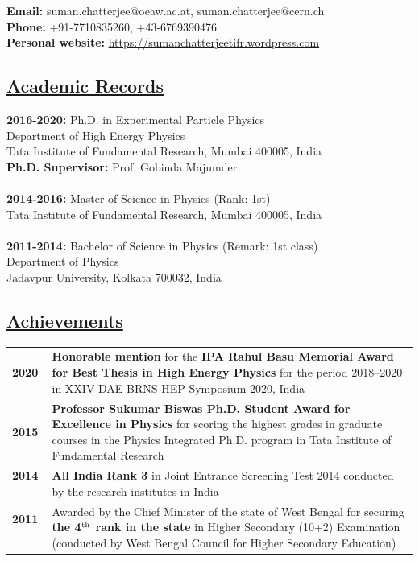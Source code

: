 \documentclass[a4paper,11pt]{article}
\begin{document}
{\textbf{Email:} suman.chatterjee@oeaw.ac.at, suman.chatterjee@cern.ch\\
\textbf{Phone: } +91-7710835260, +43-6769390476\\
\textbf{Personal website: } \href{https://sumanchatterjeetifr.wordpress.com}{https://sumanchatterjeetifr.wordpress.com}


\subsection*{\underline{Academic Records}}

\textbf{2016-2020:}
Ph.D. in Experimental Particle Physics\\
Department of High Energy Physics\\
Tata Institute of Fundamental Research, Mumbai 400005, India\\
\textbf{Ph.D. Supervisor:} Prof. Gobinda Majumder\\
\\
\textbf{2014-2016:}
Master of Science in Physics (Rank: 1st)\\
Tata Institute of Fundamental Research, Mumbai 400005, India\\
\\
\textbf{2011-2014:}
Bachelor of Science in Physics (Remark: 1st class)\\
Department of Physics\\
Jadavpur University, Kolkata  700032, India\\

\subsection*{\underline{Achievements}}

\begin{tabular}{ p{2cm} p{13cm} }
\textbf{2020} & {\textbf{Honorable mention} for the \textbf{IPA Rahul Basu Memorial Award for Best Thesis in High Energy Physics} for the period 2018--2020 in XXIV DAE-BRNS HEP Symposium 2020, India} \\
\textbf{2015} & {\textbf{Professor Sukumar Biswas Ph.D. Student Award for Excellence in Physics} for scoring the highest grades in graduate courses in the Physics Integrated Ph.D. program in Tata Institute of Fundamental Research} \\
\textbf{2014} \ & \textbf{All India Rank 3} in Joint Entrance Screening Test 2014 conducted by the research institutes in India  \\
\textbf{2011} \ & Awarded by the Chief Minister of the state of West Bengal for securing \textbf{the 4$^{\rm{th}}$ rank in the state} in Higher Secondary (10+2) Examination (conducted by West Bengal Council for Higher Secondary Education)  \\
\end{tabular}


}
\end{document}
